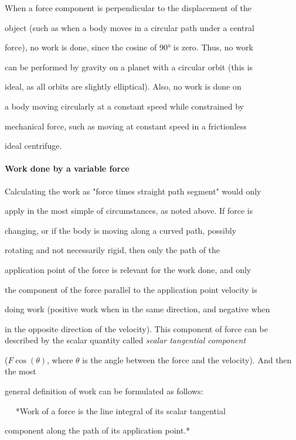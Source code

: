 When a force component is perpendicular to the displacement of the

object (such as when a body moves in a circular path under a central

force), no work is done, since the cosine of 90° is zero. Thus, no work

can be performed by gravity on a planet with a circular orbit (this is

ideal, as all orbits are slightly elliptical). Also, no work is done on

a body moving circularly at a constant speed while constrained by

mechanical force, such as moving at constant speed in a frictionless

ideal centrifuge.



\paragraph{Work done by a variable force}



Calculating the work as "force times straight path segment" would only

apply in the most simple of circumstances, as noted above. If force is

changing, or if the body is moving along a curved path, possibly

rotating and not necessarily rigid, then only the path of the

application point of the force is relevant for the work done, and only

the component of the force parallel to the application point velocity is

doing work (positive work when in the same direction, and negative when

in the opposite direction of the velocity). This component of force can be described by the scalar quantity called \textit{scalar tangential component}

($F \cos (\theta)$, where $\theta$ is the angle between the force and the velocity). And then the most

general definition of work can be formulated as follows:



$\quad$ *Work of a force is the line integral of its scalar tangential

    component along the path of its application point.*



